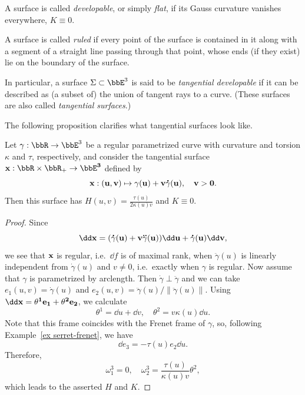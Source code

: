 \begin{defn}
    A surface is called \emph{developable}, or simply \emph{flat}, if its Gauss curvature vanishes everywhere, $K\equiv 0$.

    A surface is called \emph{ruled} if every point of the surface is contained in it along with a segment of a straight line passing through that point, whose ends (if they exist) lie on the boundary of the surface.

    In particular, a surface $\Sigma\subset\bbE^3$ is said to be \emph{tangential developable} if it can be described as (a subset of) the union of tangent rays to a curve. (These surfaces are also called \emph{tangential surfaces}.)
\end{defn}
The following proposition clarifies what tangential surfaces look like.
\begin{prop}
    Let $\gamma:\bbR\to \bbE^3$ be a regular parametrized curve with curvature and torsion $\kappa$ and $\tau$, respectively, and consider the tangential surface $\bf{x}:\bbR\times \bbR_+\to \bbE^3$ defined by 
    \[\bf{x}:(u,v)\mapsto \gamma(u)+v\dot\gamma(u),\quad v>0.\]
    Then this surface has $H(u,v)=\frac{\tau(u)}{2\kappa(u)v}$ and $K\equiv 0$.
\end{prop}
\begin{proof}
    Since 
    \[\dd \bf{x}=(\dot\gamma(u)+v\ddot\gamma(u))\dd u+\dot\gamma(u)\dd v,\]
    we see that $\bf{x}$ is regular, i.e.\ $\dd f$ is of maximal rank, when $\ddot \gamma(u)$ is linearly independent from $\dot\gamma(u)$ and $v\neq 0$, i.e.\ exactly when $\gamma$ is regular. Now assume that $\gamma$ is parametrized by arclength. Then $\dot\gamma\perp\ddot\gamma$ and we can take $e_1(u,v)=\dot\gamma(u)$ and $e_2(u,v)=\ddot\gamma(u)/\lVert\ddot\gamma(u)\rVert$. Using $\dd \bf{x}=\theta^1e_1+\theta^2e_2$, we calculate 
    \[\theta^1=\dd u+\dd v,\quad \theta^2=v\kappa(u)\dd u.\]
    Note that this frame coincides with the Frenet frame of $\gamma$, so, following Example~\ref{ex serret-frenet}, we have 
    \[\dd e_3=-\tau(u)e_2\dd u.\]
    Therefore, 
    \[\omega_1^3=0,\quad \omega_2^3=\frac{\tau(u)}{\kappa(u)v}\theta^2,\]
    which leads to the asserted $H$ and $K$.
\end{proof}

